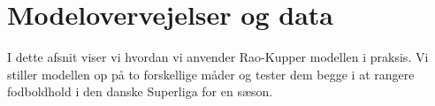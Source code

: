 \documentclass[11pt,a4paper]{article}
\begin{document}
\section{Modelovervejelser og data}
I dette afsnit viser vi hvordan vi anvender Rao-Kupper modellen i praksis. Vi stiller modellen op på to forskellige måder og tester dem begge i at rangere fodboldhold i den danske Superliga for en sæson. 
\end{document}
